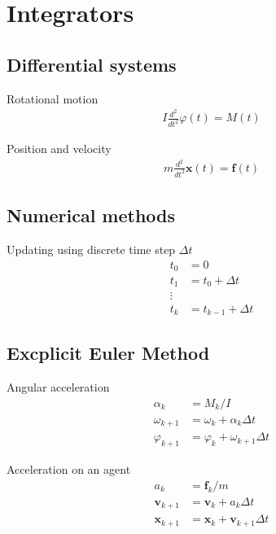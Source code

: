 \section{Integrators}
\subsection{Differential systems}
Rotational motion
\begin{align}
I \frac{d^{2}}{d t^{2}} \varphi(t) = M(t)
\end{align}

Position and velocity
\begin{align}
m \frac{d^{2}}{d t^{2}} \mathbf{x}(t) = \mathbf{f}(t)
\end{align}

\subsection{Numerical methods}
Updating using discrete time step $ \Delta t $
\begin{align}
t_{0} &= 0 \\
t_{1} &= t_{0} + \Delta t \\
\vdots \\
t_{k} &= t_{k-1} + \Delta t
\end{align}


\subsection{Excplicit Euler Method}
Angular acceleration
\begin{align}
\alpha_{k} &= M_{k} / I \\
\omega_{k+1} &= \omega_{k} + \alpha_{k} \Delta t \\
\varphi_{k+1} &= \varphi_{k} + \omega_{k+1} \Delta t
\end{align}

Acceleration on an agent
\begin{align}
a_{k} &= \mathbf{f}_{k} / m \\
\mathbf{v}_{k+1} &= \mathbf{v}_{k} + a_{k} \Delta t \\
\mathbf{x}_{k+1} &= \mathbf{x}_{k} + \mathbf{v}_{k+1} \Delta t
\end{align}


